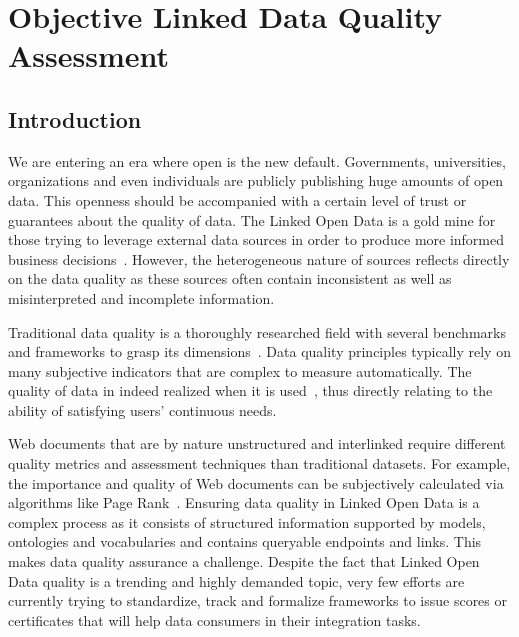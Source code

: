 \chapter{Objective Linked Data Quality Assessment}\label{chapter:data-quality}
\graphicspath{{Part1/Chapter3/figures/}}

\section{Introduction}

We are entering an era where open is the new default. Governments, universities, organizations and even individuals are publicly publishing huge amounts of open data. This openness should be accompanied with a certain level of trust or guarantees about the quality of data. The Linked Open Data is a gold mine for those trying to leverage external data sources in order to produce more informed business decisions~\cite{Boyd:Article:11}. However, the heterogeneous nature of sources reflects directly on the data quality as these sources often contain inconsistent as well as misinterpreted and incomplete information.

Traditional data quality is a thoroughly researched field with several benchmarks and frameworks to grasp its dimensions~\cite{Kahn:ACM:02,Stvilia:ASIST:07,Wang:MIS:96}. Data quality principles typically rely on many subjective indicators that are complex to measure automatically. The quality of data in indeed realized when it is used~\cite{Juran:McGraw:99}, thus directly relating to the ability of satisfying users' continuous needs.

Web documents that are by nature unstructured and interlinked require different quality metrics and assessment techniques than traditional datasets. For example, the importance and quality of Web documents can be subjectively calculated via algorithms like Page Rank~\cite{ Page:TechReport:98}. Ensuring data quality in Linked Open Data is a complex process as it consists of structured information supported by models, ontologies and vocabularies and contains queryable endpoints and links. This makes data quality assurance a challenge. Despite the fact that Linked Open Data quality is a trending and highly demanded topic, very few efforts are currently trying to standardize, track and formalize frameworks to issue scores or certificates that will help data consumers in their integration tasks.

